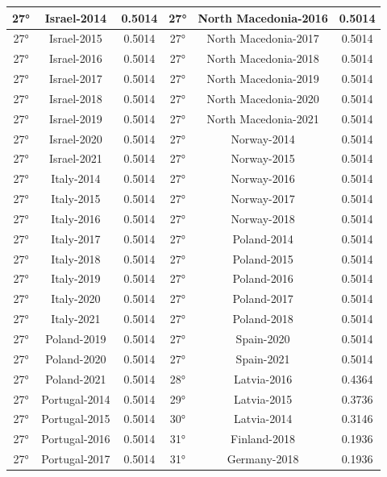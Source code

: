 \documentclass[a4paper,12pt, openright]{report}
\begin{document}
\begin{longtable}[c]{|c|c|c|c|c|c|}
    \hline
    27° &  Israel-2014 & 0.5014 & 27° & North Macedonia-2016 & 0.5014 \\
    \hline
    27° & Israel-2015 & 0.5014 & 27° & North Macedonia-2017  & 0.5014\\
    \hline
    27° & Israel-2016  & 0.5014 & 27° & North Macedonia-2018 & 0.5014 \\
    \hline
    27° & Israel-2017 & 0.5014 & 27° & North Macedonia-2019 & 0.5014 \\ 
    \hline
    27° & Israel-2018 & 0.5014 & 27° & North Macedonia-2020 & 0.5014 \\
    \hline
    27° & Israel-2019 & 0.5014 & 27° & North Macedonia-2021 & 0.5014 \\
    \hline
    27° &  Israel-2020 & 0.5014 & 27° & Norway-2014  & 0.5014 \\
    \hline
    27° &  Israel-2021  & 0.5014 & 27° & Norway-2015 & 0.5014 \\
    \hline
    27° & Italy-2014 & 0.5014 & 27° & Norway-2016 & 0.5014 \\ 
    \hline
    27° & Italy-2015 & 0.5014 & 27° & Norway-2017 & 0.5014 \\ 
    \hline
    27° &  Italy-2016 & 0.5014 & 27° & Norway-2018 & 0.5014 \\
    \hline
    27° & Italy-2017 & 0.5014 & 27° & Poland-2014  & 0.5014 \\
    \hline
    27° &  Italy-2018  & 0.5014 & 27° & Poland-2015 & 0.5014 \\ 
    \hline
    27° &  Italy-2019 & 0.5014 & 27° & Poland-2016 & 0.5014 \\ 
    \hline
    27° &  Italy-2020 & 0.5014 & 27° & Poland-2017 & 0.5014\\
    \hline
    27° & Italy-2021 & 0.5014 & 27° & Poland-2018 & 0.5014 \\
    \hline
    27° & Poland-2019  & 0.5014 & 27° & Spain-2020 & 0.5014 \\
    \hline
    27° & Poland-2020 & 0.5014 & 27° & Spain-2021 & 0.5014 \\
    \hline
    27° & Poland-2021 & 0.5014 &  28° & Latvia-2016 & 0.4364 \\
    \hline
    27° & Portugal-2014 & 0.5014 & 29° & Latvia-2015 & 0.3736 \\
    \hline
    27° & Portugal-2015 & 0.5014 &  30° & Latvia-2014  & 0.3146 \\
    \hline
    27° & Portugal-2016  & 0.5014 &  31° & Finland-2018 & 0.1936 \\
    \hline
    27° & Portugal-2017 & 0.5014 & 31° & Germany-2018  & 0.1936 \\

\end{longtable}
\end{document}
